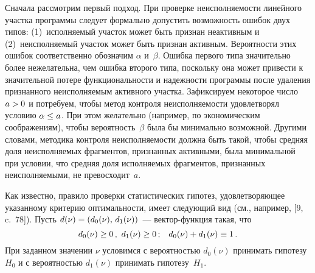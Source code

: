 \begin{multicols}{2}
Сначала рассмотрим первый подход. При проверке неисполняемости
линейного участка программы следует формально допустить возможность
ошибок двух типов: (1)~исполняемый участок может быть признан
неактивным и (2)~неис\-пол\-ня\-емый участок может быть признан активным.
Вероятности этих ошибок соответственно обозначим $\alpha$ и~$\beta$.
Ошибка первого типа значительно более нежелательна, чем ошибка
второго типа, поскольку она может привести к значительной потере
функциональности и надежности программы после удаления признанного
неисполняемым активного участка. Зафиксируем некоторое число $a\hm>0$ и
потребуем, чтобы метод контроля неисполняемости удовлетворял условию
$\alpha\hm\le a$. При этом желательно (например, по экономическим
соображениям), чтобы вероятность~$\beta$ была бы минимально
возможной. Другими словами, методика контроля неисполняемости должна
быть такой, чтобы средняя доля неисполняемых фрагментов, признанных
активными, была минимальной при условии, что средняя доля
исполняемых фрагментов, признанных неисполняемыми, не превосходит~$a$.

Как известно, правило проверки статистических гипотез,
удовлетворяющее указанному критерию оптимальности, имеет следующий
вид (см., например, [9, c.~78]). Пусть
$d(\nu)\hm=\left(d_0(\nu),\,d_1(\nu)\right)$~--- век\-тор-функ\-ция такая, что
$$
d_0(\nu)\ge0\,,\ d_1(\nu)\ge0\,;\enskip\ d_0(\nu)+d_1(\nu)\equiv 1\,.
$$
При заданном значении $\nu$ условимся с вероят\-ностью $d_0(\nu)$
принимать гипотезу $H_0$ и с вероятностью $d_1(\nu)$ принимать
гипотезу~$H_1$.


\end{multicols}
